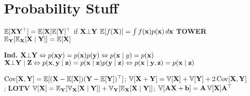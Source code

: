 \section{Probability Stuff}



\begin{colored}
    \(\E[\X\Y^\top] = \E[\X] \E[\Y]^\top\) if \(\X \bot \Y\)
    \(\E[f(\X)] = \int f(\x)p(\x)\,d\x\)
    \textbf{TOWER} \(\E_{\Y} [\E_{\X}[\X \mid \Y]] = \E[\X]\)
\end{colored}

\begin{colored}
    \textbf{Ind.}
    \(\X\bot\Y \iff p(\x\y) = p(\x)p(\y) \iff p(\x \mid y) = p(\x) \)
    \(\X\bot\Y\mid\Z \iff p(\x, \y \mid \z) = p(\x\mid\z) p(\y \mid \z)
    \iff p(\x \mid \y, \z) = p(\x \mid \z)\)

\end{colored}

\begin{colored}
    \(\Cov[\X, \Y] = \E[(\X - \E[\X])(\Y - \E[\Y])^\top]\);
    \(\Var[\X + \Y] = \Var[\X] + \Var[\Y] + 2 \Cov[\X, \Y]\);
    \textbf{LOTV} \(\Var[\X] = \E_{\Y}[\Var_{\X}[\X \mid \Y]] + \Var_{\Y}[\E_{\X}[\X \mid \Y]]\);
    \(\Var[\vb{A}\X + \vb{b}] = \vb{A}\Var[\X]\vb{A}^\top\)
\end{colored}

